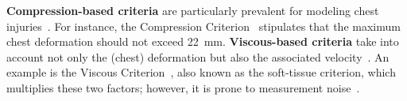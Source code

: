 \textbf{Compression-based criteria} are particularly prevalent for modeling chest injuries~\citep{haddadin2007safety, haddadin2013towards}. For instance, the Compression Criterion~\citep{lobdell1973impact, kroell1974impact} stipulates that the maximum chest deformation should not exceed \SI{22}{mm}.
%
\textbf{Viscous-based criteria} take into account not only the (chest) deformation but also the associated velocity~\citep{haddadin2007safety, haddadin2013towards}. An example is the Viscous Criterion~\citep{viano1985thoracic, lau1986viscous}, also known as the soft-tissue criterion, which multiplies these two factors; however, it is prone to measurement noise~\citep{haddadin2011safe}.

